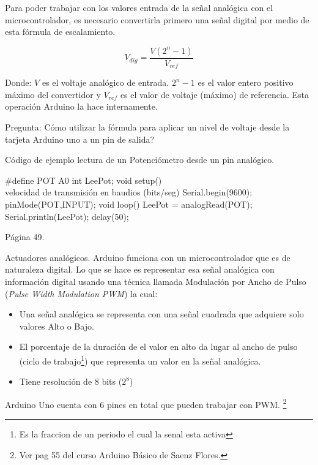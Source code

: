 \documentclass{beamer}
\theoremstyle{definition}
\begin{document}
\begin{frame}
Para poder trabajar con los valores entrada de la señal analógica con el microcontrolador, es necesario convertirla primero una señal digital por medio de esta fórmula de escalamiento.



$$V_{dig} =  \frac{ V (2^n - 1) }{V_{ref}} $$

Donde: $V$ es el voltaje analógico de entrada. $2^n-1$ es el valor entero positivo máximo del convertidor y $V_{ref}$ es el valor de voltaje (máximo) de referencia. Esta operación Arduino la hace internamente. 

Pregunta: Cómo utilizar la fórmula para aplicar un nivel de voltaje desde la tarjeta Arduino uno a un pin de salida? 

\end{frame}


\begin{frame}[fragile]
Código de ejemplo lectura de un Potenciómetro desde un pin analógico.

\tiny
\begin{verbatimtab}
#define POT A0
int LeePot;
void setup() {
	\\ velocidad de transmisión en baudios (bits/seg)
  Serial.begin(9600); 
  pinMode(POT,INPUT);
}
void loop() {
  LeePot = analogRead(POT);
  Serial.println(LeePot);
  delay(50);
}
\end{verbatimtab}

Página 49.
\end{frame}


\begin{frame}{Actuadores analógicos.}
Arduino funciona con un microcontrolador que es de naturaleza digital. 
Lo que se hace es representar esa señal analógica con información digital usando una técnica llamada Modulación por Ancho de Pulso (\textit{Pulse Width Modulation PWM}) la cual:

\begin{itemize}
\item Una señal analógica se representa con una señal cuadrada que adquiere solo valores Alto o Bajo.
\item El porcentaje de la duración de el valor en alto da lugar al ancho de pulso (ciclo de trabajo\footnote{Es la fraccion de un periodo el cual la senal esta activa}) que representa un valor en la señal analógica.
\item Tiene resolución de 8 bits ($2^8$)
\end{itemize}
Arduino Uno cuenta con 6 pines en total que pueden trabajar con PWM. \footnote{Ver pag 55 del curso Arduino Básico de Saenz Flores.}

\end{frame}
\end{document}
